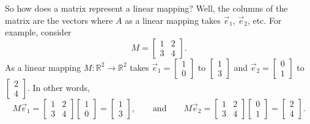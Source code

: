 \documentclass{ximera}
\begin{document}
So how does a matrix represent a linear mapping? Well, the columns of the matrix are the vectors where $A$ as a linear mapping takes $\vec{e}_1$, $\vec{e}_2$, etc. For example, consider
\begin{equation*}
    M = 
    \begin{bmatrix}
        1 & 2 \\ 3 & 4
    \end{bmatrix} .
\end{equation*}
As a linear mapping $M \colon {\mathbb R}^2 \to {\mathbb R}^2$ takes $\vec{e}_1 = \left[ \begin{smallmatrix} 1 \\ 0 \end{smallmatrix} \right]$ to $\left[ \begin{smallmatrix} 1 \\ 3 \end{smallmatrix} \right]$ and $\vec{e}_2 = \left[ \begin{smallmatrix} 0 \\ 1 \end{smallmatrix} \right]$ to $\left[ \begin{smallmatrix} 2 \\ 4 \end{smallmatrix} \right]$.  In other words,
\begin{equation*}
    M \vec{e}_1 =
    \begin{bmatrix}
        1 & 2 \\ 3 & 4
    \end{bmatrix}
    \begin{bmatrix}
        1 \\ 0
    \end{bmatrix}
    =
    \begin{bmatrix}
        1 \\ 3
    \end{bmatrix},
    \qquad \text{and} \qquad M \vec{e}_2 =
    \begin{bmatrix}
        1 & 2 \\ 3 & 4
    \end{bmatrix}
    \begin{bmatrix}
        0 \\ 1
    \end{bmatrix}
    =
    \begin{bmatrix}
        2 \\ 4
    \end{bmatrix}.
\end{equation*}
\end{document}

